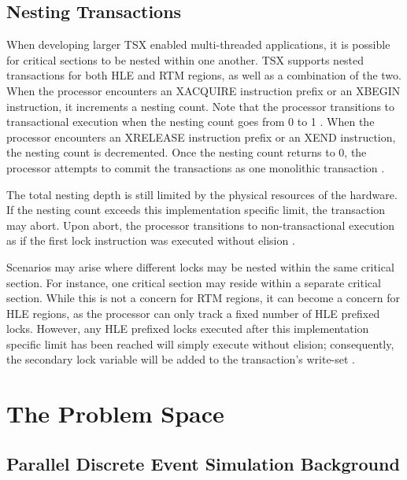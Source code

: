 \documentclass[a4paper]{article}
\begin{document}
\subsection{\textbf{Nesting Transactions}}

\indent
When developing larger TSX enabled multi-threaded applications, it is
possible for critical sections to be nested within one another.  TSX supports
nested transactions for both HLE and RTM regions, as well as a combination of
the two.  When the processor encounters an XACQUIRE instruction prefix or an 
XBEGIN instruction, it increments a nesting count.  Note that the processor
transitions to transactional execution when the nesting count goes from 0 to 1
\cite{intel_prog_ref}.  When the processor encounters an XRELEASE instruction
prefix or an XEND instruction, the nesting count is decremented.  Once the
nesting count returns to 0, the processor attempts to commit the transactions as
one monolithic transaction \cite{intel_prog_ref}.
\par

\indent
The total nesting depth is still limited by the physical resources of
the hardware.  If the nesting count exceeds this implementation specific limit,
the transaction may abort.  Upon abort, the processor transitions to
non-transactional execution as if the first lock instruction was executed
without elision \cite{intel_prog_ref}.
\par

\indent
Scenarios may arise where different locks may be nested within the same
critical section.  For instance, one critical section may reside within a
separate critical section.  While this is not a concern for RTM regions, it can
become a concern for HLE regions, as the processor can only track a fixed number
of HLE prefixed locks.  However, any HLE prefixed locks executed after this
implementation specific limit has been reached will simply execute without
elision; consequently, the secondary lock variable will be added to the
transaction's write-set \cite{intel_prog_ref}.
\par

\newpage
\section{\textbf{The Problem Space}}

\subsection{\textbf{Parallel Discrete Event Simulation Background}}
\end{document}
